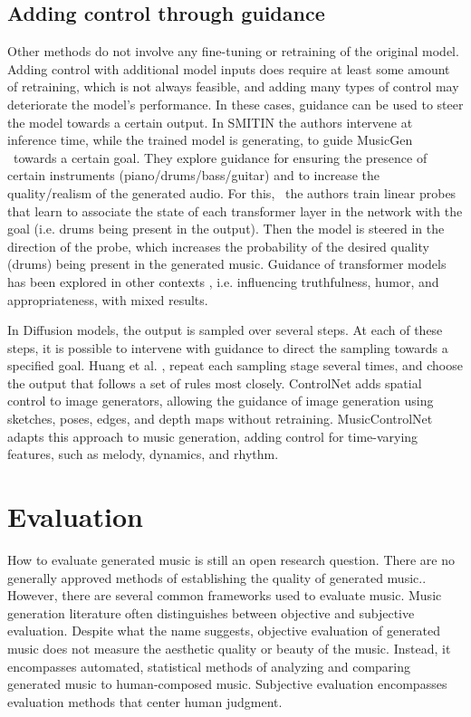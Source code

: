 \subsection{Adding control through guidance}
Other methods do not involve any fine-tuning or retraining of the original model. Adding control with additional model inputs does require at least some amount of retraining, which is not always feasible, and adding many types of control may deteriorate the model's performance. In these cases, guidance can be used to steer the model towards a certain output.
In SMITIN \cite{Koo_Wichern_Germain_SMITIN_2024} the authors intervene at inference time, while the trained model is generating, to guide MusicGen\cite{copet2023simple}  towards a certain goal. They explore guidance for ensuring the presence of certain instruments (piano/drums/bass/guitar) and to increase the quality/realism of the generated audio. For this,  the authors train linear probes that learn to associate the state of each transformer layer in the network with the goal (i.e. drums being present in the output). Then the model is steered in the direction of the probe, which increases the probability of the desired quality (drums) being present in the generated music. Guidance of transformer models has been explored in other contexts \cite{language_guide_rutte_2024}, i.e. influencing truthfulness, humor, and appropriateness, with mixed results. 

In Diffusion models, the output is sampled over several steps. At each of these steps, it is possible to intervene with guidance to direct the sampling towards a specified goal. Huang et al. \cite{Huang_rule_diffusion_2024}, repeat each sampling stage several times, and choose the output that follows a set of rules most closely. ControlNet \cite{Zhang_Rao_Agrawala_2023} adds spatial control to image generators, allowing the guidance of image generation using sketches, poses, edges, and depth maps without retraining. MusicControlNet \cite{Wu_Donahue_musicontrolnet_2023} adapts this approach to music generation, adding control for time-varying features, such as melody, dynamics, and rhythm. 

\section{Evaluation} \label{section:evaluation}
How to evaluate generated music is still an open research question. There are no generally approved methods of establishing the quality of generated music.\cite{Yin_Reuben_Stepney_Collins_2023}. However, there are several common frameworks used to evaluate music. Music generation literature often distinguishes between objective and subjective evaluation. Despite what the name suggests, objective evaluation of generated music does not measure the aesthetic quality or beauty of the music. Instead, it encompasses automated, statistical methods of analyzing and comparing generated music to human-composed music. Subjective evaluation encompasses evaluation methods that center human judgment. 

